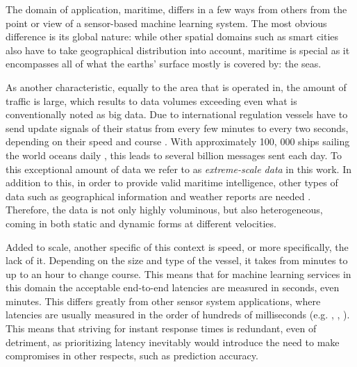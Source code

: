 The domain of application, maritime, differs in a few ways from others from the point or view of a sensor-based machine learning system. The most obvious difference is its global nature: while other spatial domains such as smart cities also have to take geographical distribution into account, maritime is special as it encompasses all of what the earths' surface mostly is covered by: the seas. 

As another characteristic, equally to the area that is operated in, the amount of traffic is large, which results to data volumes exceeding even what is conventionally noted as big data. Due to international regulation vessels have to send update signals of their status from every few minutes to every two seconds, depending on their speed and course \cite{maritimeinformatics}. With approximately 100, 000 ships sailing the world oceans daily \cite{maritimeinformatics}, this leads to several billion messages sent each day. To this exceptional amount of data we refer to as \textit{extreme-scale data} in this work. In addition to this, in order to provide valid maritime intelligence, other types of data such as geographical information and weather reports are needed \cite{D1.1}. Therefore, the data is not only highly voluminous, but also heterogeneous, coming in both static and dynamic forms at different velocities.

Added to scale, another specific of this context is speed, or more specifically, the lack of it. Depending on the size and type of the vessel, it takes from minutes to up to an hour to change course. This means that for machine learning services in this domain the acceptable end-to-end latencies are measured in seconds, even minutes. This differs greatly from other sensor system applications, where latencies are usually measured in the order of hundreds of milliseconds (e.g. \cite{anomalysystem}, \cite{facebook}, \cite{edgelatency}). This means that striving for instant response times is redundant, even of detriment, as prioritizing latency inevitably would introduce the need to make compromises in other respects, such as prediction accuracy.

